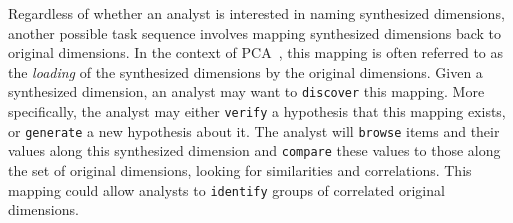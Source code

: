 



Regardless of whether an analyst is interested in naming synthesized dimensions, another possible task sequence involves mapping synthesized dimensions back to original dimensions.
In the context of \ac{PCA}~\cite{Jolliffe2002}, this mapping is often referred to as the {\it loading} of the synthesized dimensions by the original dimensions.
Given a synthesized dimension, an analyst may want to {\tt discover} this mapping. 
More specifically, the analyst may either {\tt verify} a hypothesis that this mapping exists, or {\tt generate} a new hypothesis about it. 
The analyst will {\tt browse} items and their values along this synthesized dimension and {\tt compare} these values to those along the set of original dimensions, looking for similarities and correlations.
This mapping could allow analysts to {\tt identify} groups of correlated original dimensions.

